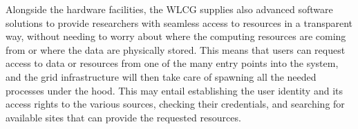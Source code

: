 Alongside the hardware facilities, the WLCG supplies also advanced software solutions to provide researchers with seamless access to resources in a transparent way, without needing to worry about where the computing resources are coming from or where the data are physically stored.
This means that users can request access to data or resources from one of the many entry points into the system, and the grid infrastructure will then take care of spawning all the needed processes under the hood.
This may entail establishing the user identity and its access rights to the various sources, checking their credentials, and searching for available sites that can provide the requested resources.